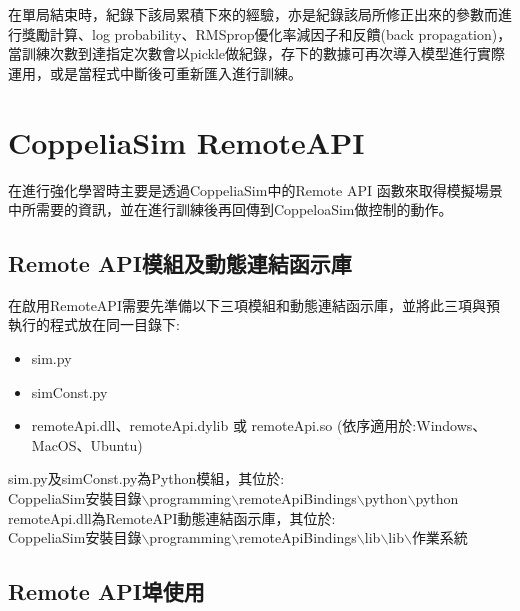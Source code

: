  在單局結束時，紀錄下該局累積下來的經驗，亦是紀錄該局所修正出來的參數而進行獎勵計算、log probability、RMSprop優化率減因子和反饋(back propagation)，當訓練次數到達指定次數會以pickle做紀錄，存下的數據可再次導入模型進行實際運用，或是當程式中斷後可重新匯入進行訓練。\\
\section{CoppeliaSim RemoteAPI}
在進行強化學習時主要是透過CoppeliaSim中的Remote API 函數來取得模擬場景中所需要的資訊，並在進行訓練後再回傳到CoppeloaSim做控制的動作。\\
\subsection{Remote API模組及動態連結函示庫}
在啟用RemoteAPI需要先準備以下三項模組和動態連結函示庫，並將此三項與預執行的程式放在同一目錄下:
\begin{itemize}
\item sim.py
\item simConst.py
\item remoteApi.dll、remoteApi.dylib 或 remoteApi.so (依序適用於:Windows、MacOS、Ubuntu)
\end{itemize}
sim.py及simConst.py為Python模組，其位於:\\
CoppeliaSim安裝目錄$\backslash$programming$\backslash$remoteApiBindings$\backslash$python$\backslash$python\\
remoteApi.dll為RemoteAPI動態連結函示庫，其位於:\\
CoppeliaSim安裝目錄$\backslash$programming$\backslash$remoteApiBindings$\backslash$lib$\backslash$lib$\backslash$作業系統\\
\subsection{Remote API埠使用}
\newpage
